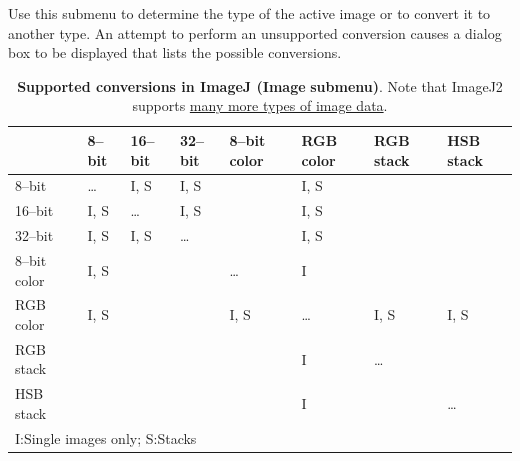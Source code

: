Use this submenu to determine the type of the active image or to convert
it to another type. An attempt to perform an unsupported conversion
causes a dialog box to be displayed that lists the possible conversions.
\begin{table}[h]
\noindent \caption{\textbf{Supported conversions in ImageJ (}\textsf{\textbf{Image}}\textbf{\lyxarrow{}
submenu)}.  Note that ImageJ2 supports \protect\href{http://developer.imagej.net/imagej2-pixel-types}{many more types of image data}.}


\noindent %
\begin{tabular}{l>{\centering}m{1.25cm}>{\centering}m{1.25cm}>{\centering}m{1.25cm}>{\centering}m{1.25cm}>{\centering}m{1.25cm}>{\centering}m{1.25cm}>{\centering}m{1.25cm}}
\toprule 
 & {\small 8--bit} & {\small 16--bit} & {\small 32--bit} & {\small 8--bit color} & {\small RGB color} & {\small RGB stack} & {\small HSB stack}\tabularnewline
\midrule
{\small 8--bit} & \ldots{} & {\small I, S} & {\small I, S} &  & {\small I, S} &  & \tabularnewline
\cmidrule{2-8} 
{\small 16--bit} & {\small I, S} & \ldots{} & {\small I, S} &  & {\small I, S} &  & \tabularnewline
\cmidrule{2-8} 
{\small 32--bit} & {\small I, S} & {\small I, S} & \ldots{} &  & {\small I, S} &  & \tabularnewline
\cmidrule{2-8} 
{\small 8--bit color} & {\small I, S} &  &  & \ldots{} & {\small I} &  & \tabularnewline
\cmidrule{2-8} 
{\small RGB color} & {\small I, S} &  &  & {\small I, S} & \ldots{} & {\small I, S} & {\small I, S}\tabularnewline
\cmidrule{2-8} 
{\small RGB stack\ } &  &  &  &  & {\small I} & \ldots{} & \tabularnewline
\cmidrule{2-8} 
{\small HSB stack} &  &  &  &  & {\small I} &  & \ldots{}\tabularnewline
\midrule
\multicolumn{8}{l}{{\small I:\enskip{}Single images only; \enskip{}S:\enskip{}Stacks}}\tabularnewline
\end{tabular}
\end{table}

